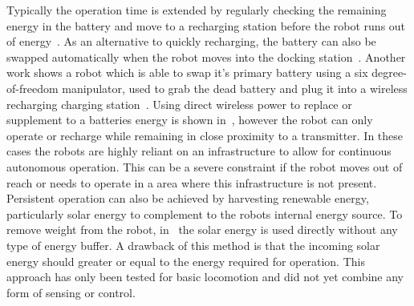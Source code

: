 Typically the operation time is extended by regularly checking the remaining energy in the battery and move to a recharging station before the robot runs out of energy~\cite{pickem_icra_2015, rubenstein_icra_2012}.
As an alternative to quickly recharging, the battery can also be swapped automatically when the robot moves into the docking station~\cite{kemal_mech_2015}.
Another work shows a robot which is able to swap it's primary battery using a six degree-of-freedom manipulator, used to grab the dead battery and plug it into a wireless recharging charging station~\cite{zhang_conel_2013}.
Using direct wireless power to replace or supplement to a batteries energy is shown in~\cite{karpelson_icra_2014}, however the robot can only operate or recharge while remaining in close proximity to a transmitter. 
In these cases the robots are highly reliant on an infrastructure to allow for continuous autonomous operation.
This can be a severe constraint if the robot moves out of reach or needs to operate in a area where this infrastructure is not present. Persistent operation can also be achieved by harvesting renewable energy, particularly solar energy to complement to the robots internal energy source. 
To remove weight from the robot, in~\cite{bruhwiler_iros_2015} the solar energy is used directly without any type of energy buffer. 
A drawback of this method is that the incoming solar energy should greater or equal to the energy required for operation. 
This approach has only been tested for basic locomotion and did not yet combine any form of sensing or control.




